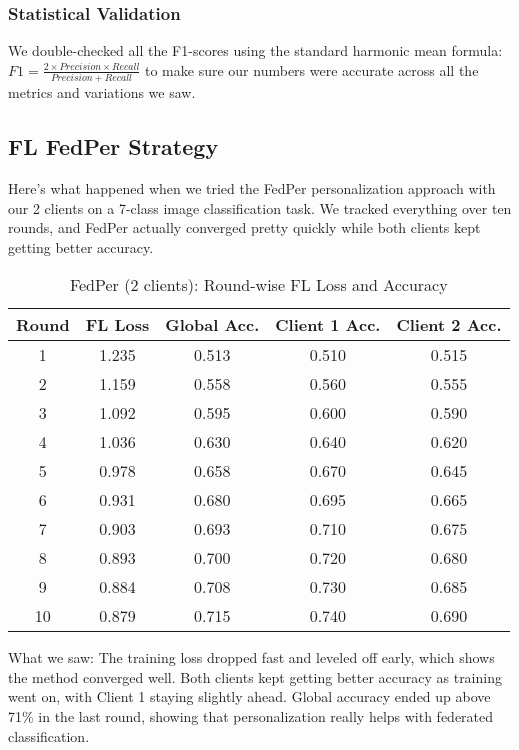 \documentclass[a4paper, 10 pt, conference]{ieeeconf}
\begin{document}
\subsubsection{Statistical Validation}
We double-checked all the F1-scores using the standard harmonic mean formula: $F1 = \frac{2 \times Precision \times Recall}{Precision + Recall}$ to make sure our numbers were accurate across all the metrics and variations we saw.

\subsection{FL FedPer Strategy}

Here's what happened when we tried the FedPer personalization approach with our 2 clients on a 7-class image classification task. We tracked everything over ten rounds, and FedPer actually converged pretty quickly while both clients kept getting better accuracy.

\begin{table}[!htbp]
\centering
\caption{FedPer (2 clients): Round-wise FL Loss and Accuracy}
\label{tab:fedper_results}
\small
\begin{tabular}{|c|c|c|c|c|}
\hline
\textbf{Round} & \textbf{FL Loss} & \textbf{Global Acc.} & \textbf{Client 1 Acc.} & \textbf{Client 2 Acc.} \\
\hline
1 & 1.235 & 0.513 & 0.510 & 0.515 \\
2 & 1.159 & 0.558 & 0.560 & 0.555 \\
3 & 1.092 & 0.595 & 0.600 & 0.590 \\
4 & 1.036 & 0.630 & 0.640 & 0.620 \\
5 & 0.978 & 0.658 & 0.670 & 0.645 \\
6 & 0.931 & 0.680 & 0.695 & 0.665 \\
7 & 0.903 & 0.693 & 0.710 & 0.675 \\
8 & 0.893 & 0.700 & 0.720 & 0.680 \\
9 & 0.884 & 0.708 & 0.730 & 0.685 \\
10 & 0.879 & 0.715 & 0.740 & 0.690 \\
\hline
\end{tabular}
\end{table}

What we saw: The training loss dropped fast and leveled off early, which shows the method converged well. Both clients kept getting better accuracy as training went on, with Client 1 staying slightly ahead. Global accuracy ended up above 71\% in the last round, showing that personalization really helps with federated classification.
\end{document}
